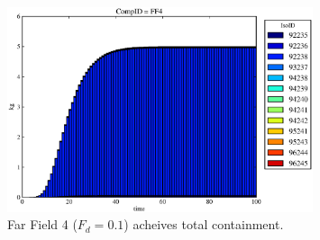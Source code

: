 \begin{frame}[ctb!]
\begin{figure}
\begin{minipage}[b]{0.45\linewidth}
  \includegraphics[width=0.8\textwidth]{./images/mcIII0.eps}
  \caption[Case MCI Waste Package Contaminants.]{ 
    Far Field 4 ($F_d = 0.1$) acheives total containment.
    }
  \label{fig:mcII}


  \end{minipage}
\end{figure}

\end{frame}
